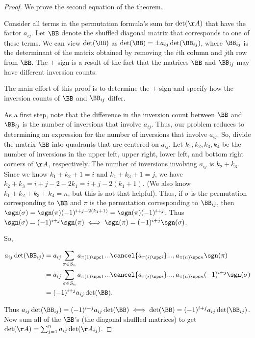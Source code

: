 \begin{proof}
    We prove the second equation of the theorem.
    
    Consider all terms in the permutation formula's sum for $\det(\AA)$ that have the factor $a_{ij}$. Let $\BB$ denote the shuffled diagonal matrix that corresponds to one of these terms. We can view $\det(\BB)$ as $\det(\BB) = \pm a_{ij} \det(\BB_{ij})$, where $\BB_{ij}$ is the determinant of the matrix obtained by removing the $i$th column and $j$th row from $\BB$. The $\pm$ sign is a result of the fact that the matrices $\BB$ and $\BB_{ij}$ may have different inversion counts.

    The main effort of this proof is to determine the $\pm$ sign and specify how the inversion counts of $\BB$ and $\BB_{ij}$ differ.
    
    As a first step, note that the difference in the inversion count between $\BB$ and $\BB_{ij}$ is the number of inversions that involve $a_{ij}$. Thus, our problem reduces to determining an expression for the number of inversions that involve $a_{ij}$. So, divide the matrix $\BB$ into quadrants that are centered on $a_{ij}$. Let $k_1, k_2, k_3, k_4$ be the number of inversions in the upper left, upper right, lower left, and bottom right corners of $\AA$, respectively. The number of inversions involving $a_{ij}$ is $k_2 + k_3$. Since we know $k_1 + k_2 + 1 = i$ and $k_1 + k_3 + 1 = j$, we have $k_2 + k_3 = i + j - 2 - 2k_1 = i + j - 2(k_1 + 1)$. (We also know $k_1 + k_2 + k_3 + k_4 = n$, but this is not that helpful). Thus, if $\sigma$ is the permutation corresponding to $\BB$ and $\pi$ is the permutation corresponding to $\BB_{ij}$, then $\sgn(\sigma) = \sgn(\pi)(-1)^{i + j - 2(k_1 + 1)} = \sgn(\pi)(-1)^{i + j}$. Thus $\sgn(\sigma) = (-1)^{i + j}\sgn(\pi) \iff \sgn(\pi) = (-1)^{i + j}\sgn(\sigma)$. 
    
    So,
    
    \begin{align*}
        a_{ij} \det(\BB_{ij}) &= a_{ij} \sum_{\pi \in S_n} a_{\pi(1) \spc 1} ... \cancel{a_{\pi(i) \spc i}} ..., a_{\pi(n) \spc n} \sgn(\pi) \\
        &= a_{ij} \sum_{\sigma \in S_n} a_{\pi(1) \spc 1} ... \cancel{a_{\pi(i) \spc i}} ..., a_{\pi(n) \spc n} (-1)^{i + j} \sgn(\sigma) \\
        &= (-1)^{i + j} a_{ij} \det(\BB).
    \end{align*}
    
    Thus $a_{ij} \det(\BB_{ij}) = (-1)^{i + j} a_{ij} \det(\BB) \iff \det(\BB) = (-1)^{i + j} a_{ij} \det(\BB_{ij})$. Now sum all of the $\BB$'s (the diagonal shuffled matrices) to get $\det(\AA) = \sum_{j = 1}^{n} a_{ij} \det(\AA_{ij})$.
\end{proof}
    
